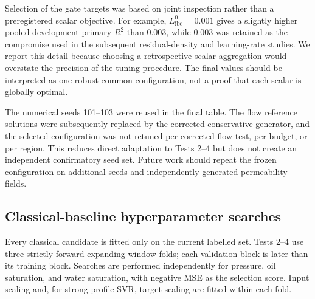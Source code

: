 Selection of the gate targets was based on joint inspection rather than a preregistered scalar objective. For example, \(L^0_{\mathrm{ibc}}=0.001\) gives a slightly higher pooled development primary \(R^2\) than 0.003, while 0.003 was retained as the compromise used in the subsequent residual-density and learning-rate studies. We report this detail because choosing a retrospective scalar aggregation would overstate the precision of the tuning procedure. The final values should be interpreted as one robust common configuration, not a proof that each scalar is globally optimal.

The numerical seeds 101--103 were reused in the final table. The flow reference solutions were subsequently replaced by the corrected conservative generator, and the selected configuration was not retuned per corrected flow test, per budget, or per region. This reduces direct adaptation to Tests 2--4 but does not create an independent confirmatory seed set. Future work should repeat the frozen configuration on additional seeds and independently generated permeability fields.

\subsection{Classical-baseline hyperparameter searches}

Every classical candidate is fitted only on the current labelled set. Tests 2--4 use three strictly forward expanding-window folds; each validation block is later than its training block. Searches are performed independently for pressure, oil saturation, and water saturation, with negative MSE as the selection score. Input scaling and, for strong-profile SVR, target scaling are fitted within each fold.

